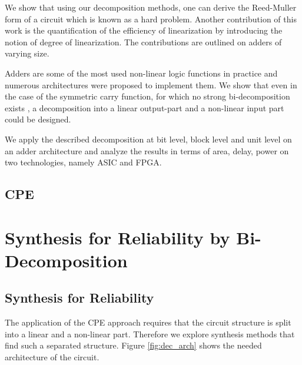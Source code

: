 \documentclass[12pt]{toptesi}
\begin{document}
We show that using our decomposition methods, one can derive the Reed-Muller form of a circuit which is known as a hard problem.
\cite{Knysh11}
Another contribution of this work is the quantification of the efficiency of linearization by introducing the notion of degree of linearization. The contributions are outlined on adders of varying size.

Adders are some of the most used non-linear logic functions in practice and numerous architectures were proposed to implement them. We show that even in the case of the symmetric carry function, for which no strong bi-decomposition exists \cite{BDS_NDM_MCD_EDAC_1991,MSP_ABD_LF_DAC_2001}, a decomposition into a linear output-part and a non-linear input part could be designed.

We apply the described decomposition at bit level, block level and unit level on an adder architecture and analyze the results in terms of area, delay, power on two technologies, namely ASIC and FPGA.

\section{CPE}

\chapter{Synthesis for Reliability by Bi-Decomposition}


\section{Synthesis for Reliability}

The application of the CPE approach requires that the circuit structure is split into a linear and a non-linear part. Therefore we explore synthesis methods that find such a separated structure. Figure \ref{fig:dec_arch} shows the needed architecture of the circuit.
\end{document}
